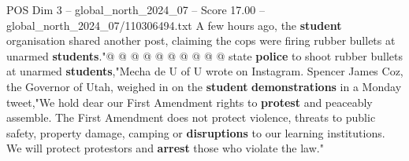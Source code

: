 \begin{textsample}{POS Dim 3 – global\_north\_2024\_07 – Score 17.00 – global\_north\_2024\_07/110306494.txt}
A few hours ago, the \textbf{student} organisation shared another post, claiming the cops were firing rubber bullets at unarmed \textbf{students}."@ @ @ @ @ @ @ @ @ @ state \textbf{police} to shoot rubber bullets at unarmed \textbf{students},"Mecha de U of U wrote on Instagram.
Spencer James Coz, the Governor of Utah, weighed in on the \textbf{student} \textbf{demonstrations} in a Monday tweet,"We hold dear our First Amendment rights to \textbf{protest} and peaceably assemble.
The First Amendment does not protect violence, threats to public safety, property damage, camping or \textbf{disruptions} to our learning institutions.
We will protect protestors and \textbf{arrest} those who violate the law."

\end{textsample}
